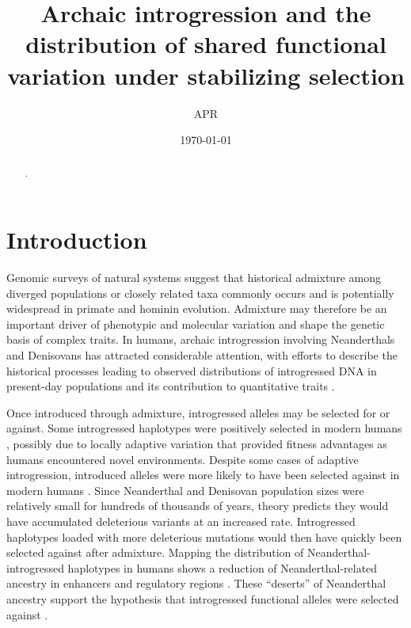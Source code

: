 \documentclass{article}
\title{Archaic introgression and the distribution
of shared functional variation under stabilizing selection}
\author{APR}
\date{\today}
\begin{document}
\maketitle    


\begin{abstract}
    .
\end{abstract}

\onehalfspacing

\section*{Introduction}

Genomic surveys of natural systems suggest that historical admixture among
diverged populations or closely related taxa commonly occurs
\citep{brandvain2014speciation,skoglund2015ancient,suvorov2022widespread} and
is potentially widespread in primate
\citep{tung2017contribution,sorensen2023genome} and hominin
\citep{wolf2018outstanding,peter2020100} evolution. Admixture may therefore be
an important driver of phenotypic and molecular variation and shape the genetic
basis of complex traits. In humans, archaic introgression involving
Neanderthals and Denisovans has attracted considerable attention, with efforts
to describe the historical processes leading to observed distributions of
introgressed DNA in present-day populations
\citep{prufer2014complete,villanea2019multiple,chen2020identifying} and its
contribution to quantitative traits
\citep{sankararaman2016combined,wei2023lingering}.

Once introduced through admixture, introgressed alleles may be selected for or
against. Some introgressed haplotypes were positively selected in modern humans
\citep{huerta2014altitude,racimo2017signatures,enard2018evidence,gower2021detecting},
possibly due to locally adaptive variation that provided fitness advantages as
humans encountered novel environments. Despite some cases of adaptive
introgression, introduced alleles were more likely to have been selected
against in modern humans \citep{harris2016genetic,juric2016strength}. Since
Neanderthal and Denisovan population sizes were relatively small for hundreds
of thousands of years, theory predicts they would have accumulated deleterious
variants at an increased rate. Introgressed haplotypes loaded with more
deleterious mutations would then have quickly been selected against after
admixture. Mapping the distribution of Neanderthal-introgressed haplotypes in
humans shows a reduction of Neanderthal-related ancestry in enhancers and
regulatory regions
\citep{petr2019limits,telis2020selection,yermakovich2023long}. These
``deserts'' of Neanderthal ancestry support the hypothesis that introgressed
functional alleles were selected against
\citep{sankararaman2014genomic,sankararaman2016combined}.
\end{document}

